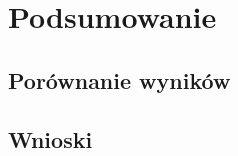 \chapter{Podsumowanie}\label{ch:podsumowanie}

\section{Porównanie wyników}\label{sec:analiza_porownawcza}

\section{Wnioski}\label{sec:wnioski_kierunki}
